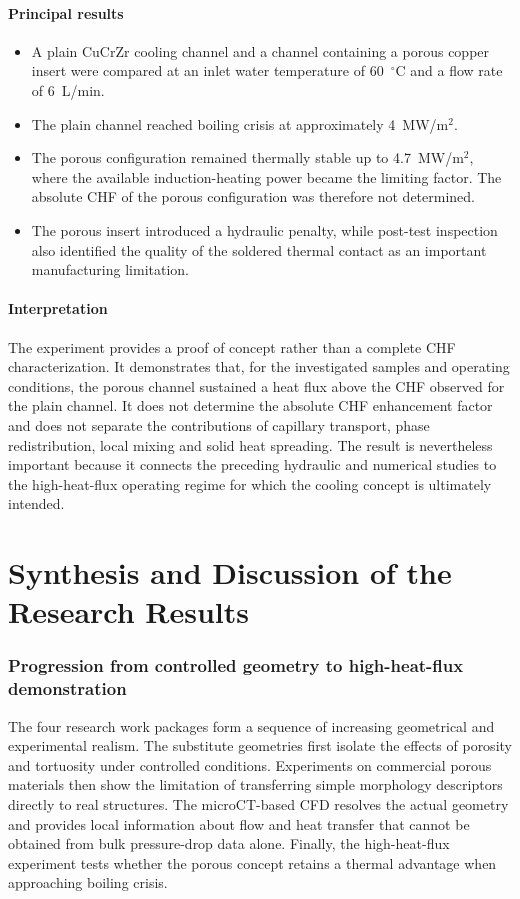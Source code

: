 \documentclass[a4paper]{article}
\begin{document}
\subsection*{Principal results}
\begin{itemize}
    \item A plain CuCrZr cooling channel and a channel containing a porous copper insert were compared at an inlet water temperature of 60~$^\circ$C and a flow rate of 6~L/min.
    \item The plain channel reached boiling crisis at approximately 4~MW/m$^2$.
    \item The porous configuration remained thermally stable up to 4.7~MW/m$^2$, where the available induction-heating power became the limiting factor. The absolute CHF of the porous configuration was therefore not determined.
    \item The porous insert introduced a hydraulic penalty, while post-test inspection also identified the quality of the soldered thermal contact as an important manufacturing limitation.
\end{itemize}

\subsection*{Interpretation}
The experiment provides a proof of concept rather than a complete CHF characterization. It demonstrates that, for the investigated samples and operating conditions, the porous channel sustained a heat flux above the CHF observed for the plain channel. It does not determine the absolute CHF enhancement factor and does not separate the contributions of capillary transport, phase redistribution, local mixing and solid heat spreading. The result is nevertheless important because it connects the preceding hydraulic and numerical studies to the high-heat-flux operating regime for which the cooling concept is ultimately intended.

\pagebreak
\part{Synthesis and Discussion of the Research Results}

\section{Progression from controlled geometry to high-heat-flux demonstration}
The four research work packages form a sequence of increasing geometrical and experimental realism. The substitute geometries first isolate the effects of porosity and tortuosity under controlled conditions. Experiments on commercial porous materials then show the limitation of transferring simple morphology descriptors directly to real structures. The microCT-based CFD resolves the actual geometry and provides local information about flow and heat transfer that cannot be obtained from bulk pressure-drop data alone. Finally, the high-heat-flux experiment tests whether the porous concept retains a thermal advantage when approaching boiling crisis.
\end{document}
